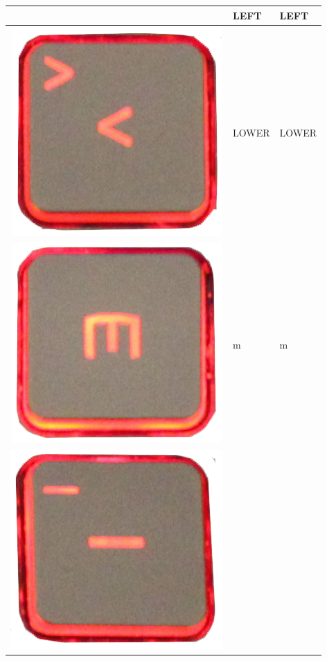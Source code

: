 \begin{longtable}{|cll|}
\begin{minipage}[c]{.4\textwidth}
\vspace{0.2cm}
\end{minipage} & LEFT & LEFT\\
\hline
\begin{minipage}[c]{.4\textwidth}
\vspace{0.2cm}
\includegraphics[scale=0.08]{Images/KeyMapping/LOWER}
\vspace{0.2cm}
\end{minipage} & LOWER & LOWER\\
\hline
\begin{minipage}[c]{.4\textwidth}
\vspace{0.2cm}
\includegraphics[scale=0.08]{Images/KeyMapping/m}
\vspace{0.2cm}
\end{minipage} & m & m\\
\hline
\begin{minipage}[c]{.4\textwidth}
\vspace{0.2cm}
\includegraphics[scale=0.08]{Images/KeyMapping/MINUS}

\end{minipage}
\end{longtable}
